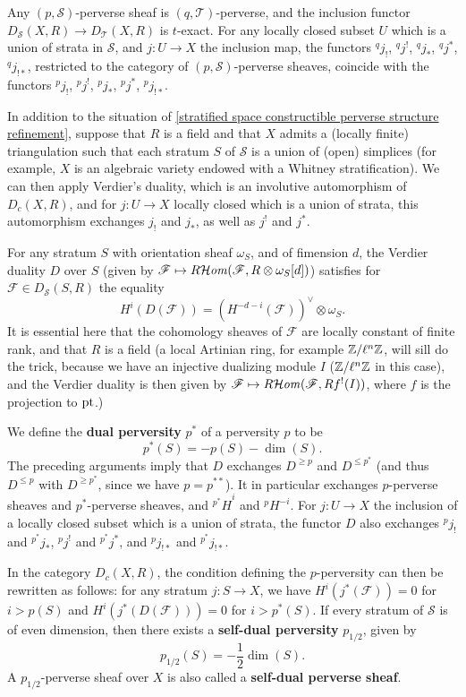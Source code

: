 \begin{corollary}\label{stratified space constructible perverse refinement functor prop}
Any $(p,\mathcal{S})$-perverse sheaf is $(q,\mathcal{T})$-perverse, and the inclusion functor $D_\mathcal{S}(X,R)\to D_\mathcal{T}(X,R)$ is $t$-exact. For any locally closed subset $U$ which is a union of strata in $\mathcal{S}$, and $j:U\to X$ the inclusion map, the functors ${^qj_!}$, ${^qj^!}$, ${^qj_*}$, ${^qj^*}$, ${^qj_{!*}}$, restricted to the category of $(p,\mathcal{S})$-perverse sheaves, coincide with the functors ${^p\!j_!}$, ${^p\!j^!}$, ${^p\!j_*}$, ${^p\!j^*}$, ${^p\!j_{!*}}$.
\end{corollary}

In addition to the situation of \cref{stratified space constructible perverse structure refinement}, suppose that $R$ is a field and that $X$ admits a (locally finite) triangulation such that each stratum $S$ of $\mathcal{S}$ is a union of (open) simplices (for example, $X$ is an algebraic variety endowed with a Whitney stratification). We can then apply Verdier's duality, which is an involutive automorphism of $D_c(X,R)$, and for $j:U\to X$ locally closed which is a union of strata, this automorphism exchanges $j_!$ and $j_*$, as well as $j^!$ and $j^*$.\par
For any stratum $S$ with orientation sheaf $\omega_S$, and of fimension $d$, the Verdier duality $D$ over $S$ (given by $\mathscr{F}\mapsto R\!\operatorname{\mathcal{H}\hspace*{-0.4pt}\textit{om}\hspace{0.5pt}}(\mathscr{F},R\otimes\omega_S[d])$) satisfies for $\mathscr{F}\in D_\mathcal{S}(S,R)$ the equality
\[H^i(D(\mathscr{F}))=(H^{-d-i}(\mathscr{F}))^{\vee}\otimes\omega_S.\]
It is essential here that the cohomology sheaves of $\mathscr{F}$ are locally constant of finite rank, and that $R$ is a field (a local Artinian ring, for example $\mathbb{Z}/\ell^n\mathbb{Z}$, will sill do the trick, because we have an injective dualizing module $I$ ($\mathbb{Z}/\ell^n\mathbb{Z}$ in this case), and the Verdier duality is then given by $\mathscr{F}\mapsto R\!\operatorname{\mathcal{H}\hspace*{-0.4pt}\textit{om}\hspace{0.5pt}}(\mathscr{F},Rf^!(I))$, where $f$ is the projection to $\mathrm{pt}$.)\par

We define the \textbf{dual perversity} $p^*$ of a perversity $p$ to be
\[p^*(S)=-p(S)-\dim(S).\]
The preceding arguments imply that $D$ exchanges $D^{\geq p}$ and $D^{\leq p^*}$ (and thus $D^{\leq p}$ with $D^{\geq p^*}$, since we have $p=p^{**}$). It in particular exchanges $p$-perverse sheaves and $p^*$-perverse sheaves, and ${^{p^*}H}^i$ and ${^p\!H^{-i}}$. For $j:U\to X$ the inclusion of a locally closed subset which is a union of strata, the functor $D$ also exchanges ${^p\!j_!}$ and ${^{p^*}j_*}$, ${^p\!j^!}$ and ${^{p^*}j^*}$, and ${^p\!j_{!*}}$ and ${^{p^*}j_{!*}}$.\par
In the category $D_c(X,R)$, the condition defining the $p$-perversity can then be rewritten as follows: for any stratum $j:S\to X$, we have $H^i(j^*(\mathscr{F}))=0$ for $i>p(S)$ and $H^i(j^*(D(\mathscr{F})))=0$ for $i>p^*(S)$. If every stratum of $\mathcal{S}$ is of even dimension, then there exists a \textbf{self-dual perversity} $p_{1/2}$, given by
\[p_{1/2}(S)=-\frac{1}{2}\dim(S).\]
A $p_{1/2}$-perverse sheaf over $X$ is also called a \textbf{self-dual perverse sheaf}.


